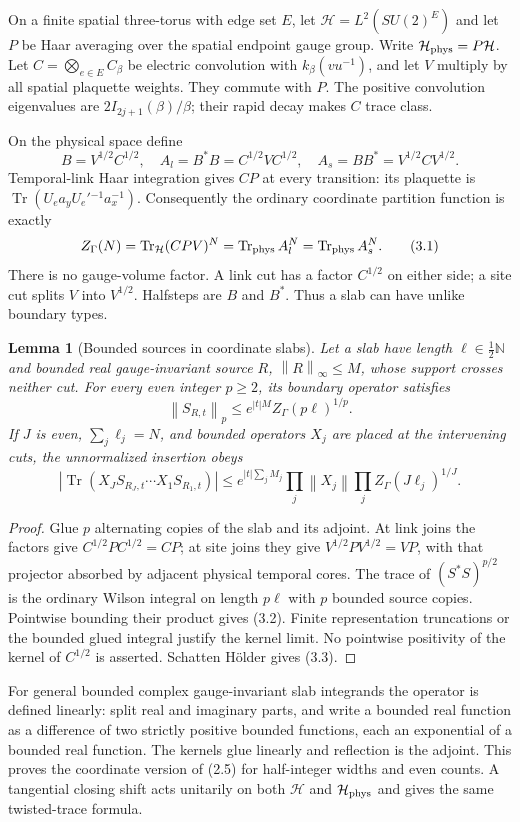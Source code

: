\documentclass[11pt]{article}
\newtheorem{lemma}[theorem]{Lemma}
\theoremstyle{remark}
\newcommand{\tr}{\operatorname{Tr}}
\newcommand{\norm}[1]{\left\|#1\right\|}
\begin{document}
On a finite spatial three-torus with edge set $E$, let
$\mathcal H=L^2(SU(2)^E)$ and let $P$ be Haar averaging over the
spatial endpoint gauge group. Write $\mathcal H_{\rm phys}=P\mathcal H$.
Let $C=\bigotimes_{e\in E}C_\beta$ be electric convolution with
$k_\beta(vu^{-1})$, and let $V$ multiply by all spatial plaquette
weights. They commute with $P$. The positive convolution eigenvalues
are $2I_{2j+1}(\beta)/\beta$; their rapid decay makes $C$ trace class.

On the physical space define
\[
 B=V^{1/2}C^{1/2},\quad A_l=B^*B=C^{1/2}VC^{1/2},
 \quad A_s=BB^*=V^{1/2}CV^{1/2}.
\]
Temporal-link Haar integration gives $CP$ at every transition:
its plaquette is $\tr(U_ea_yU_e'{}^{-1}a_x^{-1})$.
Consequently the ordinary coordinate partition function is exactly
\[
 Z_\Gamma(N)=\tr_{\mathcal H}(CPV)^N
           =\tr_{\rm phys}A_l^N=\tr_{\rm phys}A_s^N.
 \tag{3.1}
\]
There is no gauge-volume factor. A link cut has a factor $C^{1/2}$
on either side; a site cut splits $V$ into $V^{1/2}$. Halfsteps
are $B$ and $B^*$. Thus a slab can have unlike boundary types.

\begin{lemma}[Bounded sources in coordinate slabs]\label{lem:schatten}
Let a slab have length $\ell\in\tfrac12\mathbb N$ and bounded real
gauge-invariant source $R$, $\norm R_\infty\le M$, whose support crosses neither cut.
For every even integer $p\ge2$, its boundary operator satisfies
\[
 \norm{S_{R,t}}_p\le e^{|t|M}Z_\Gamma(p\ell)^{1/p}.
 \tag{3.2}
\]
If $J$ is even, $\sum_j\ell_j=N$, and bounded operators $X_j$
are placed at the intervening cuts, the unnormalized insertion obeys
\[
 \left|\tr(X_JS_{R_J,t}\cdots X_1S_{R_1,t})\right|
 \le e^{|t|\sum_jM_j}\prod_j\norm{X_j}
       \prod_j Z_\Gamma(J\ell_j)^{1/J}.
 \tag{3.3}
\]
\end{lemma}
\begin{proof}
Glue $p$ alternating copies of the slab and its adjoint.
At link joins the factors give $C^{1/2}PC^{1/2}=CP$;
at site joins they give $V^{1/2}PV^{1/2}=VP$, with that
projector absorbed by adjacent physical temporal cores.
The trace of $(S^*S)^{p/2}$ is the ordinary Wilson integral
on length $p\ell$ with $p$ bounded source copies. Pointwise
bounding their product gives (3.2). Finite representation truncations
or the bounded glued integral justify the kernel limit.
No pointwise positivity of the kernel of $C^{1/2}$ is asserted.
Schatten H\"older gives (3.3).
\end{proof}

For general bounded complex gauge-invariant slab integrands the
operator is defined linearly: split real and imaginary parts, and
write a bounded real function as a difference of two strictly positive
bounded functions, each an exponential of a bounded real function.
The kernels glue linearly and reflection is the adjoint. This proves
the coordinate version of (2.5) for half-integer widths and even counts.
A tangential closing shift acts unitarily on both $\mathcal H$ and
$\mathcal H_{\rm phys}$ and gives the same twisted-trace formula.
\end{document}

